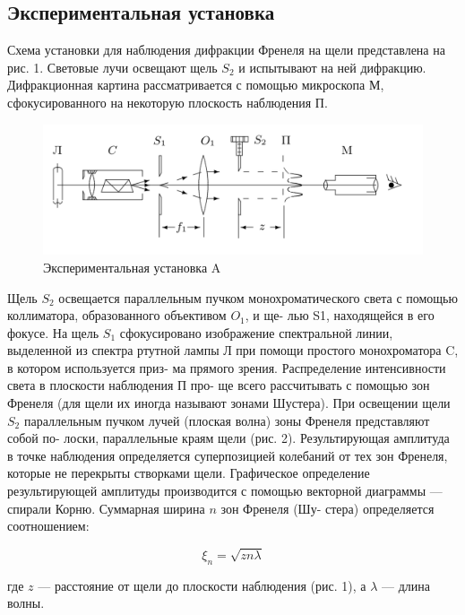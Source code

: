 \documentclass[12pt]{kiarticle}
\begin{document}
	\subsection{Экспериментальная установка}
	
	Схема установки для наблюдения дифракции Френеля на щели
представлена на рис. 1. Световые лучи освещают щель $ S_2 $ и испытывают на ней дифракцию. Дифракционная картина рассматривается с помощью микроскопа М, сфокусированного на некоторую плоскость наблюдения П.
	
	\begin{figure}[h!]
		\centering
		\includegraphics[width=0.8\linewidth]{a.png}
		\caption{Экспериментальная установка A}
		\label{labA}
	\end{figure}

Щель $ S_2 $ освещается параллельным пучком монохроматического
света с помощью коллиматора, образованного объективом $ O_1 $, и ще-
лью S1, находящейся в его фокусе. На щель $ S_1 $ сфокусировано изображение спектральной линии, выделенной из спектра ртутной лампы Л
при помощи простого монохроматора C, в котором используется приз-
ма прямого зрения.
Распределение интенсивности света в плоскости наблюдения П про-
ще всего рассчитывать с помощью зон Френеля (для щели их иногда
называют зонами Шустера). При освещении щели $ S_2 $ параллельным пучком лучей (плоская волна) зоны Френеля представляют собой по-
лоски, параллельные краям щели (рис. 2). Результирующая амплитуда
в точке наблюдения определяется суперпозицией колебаний от тех зон
Френеля, которые не перекрыты створками щели. Графическое определение результирующей амплитуды производится с помощью векторной
диаграммы --- спирали Корню. Суммарная ширина $ n $ зон Френеля (Шу-
стера) определяется соотношением:

\begin{equation}\label{xin}
\xi_n = \sqrt{zn\lambda}
\end{equation}

где $ z $ --- расстояние от щели до плоскости наблюдения (рис. 1), а $ \lambda $ --- длина волны.
\end{document}
